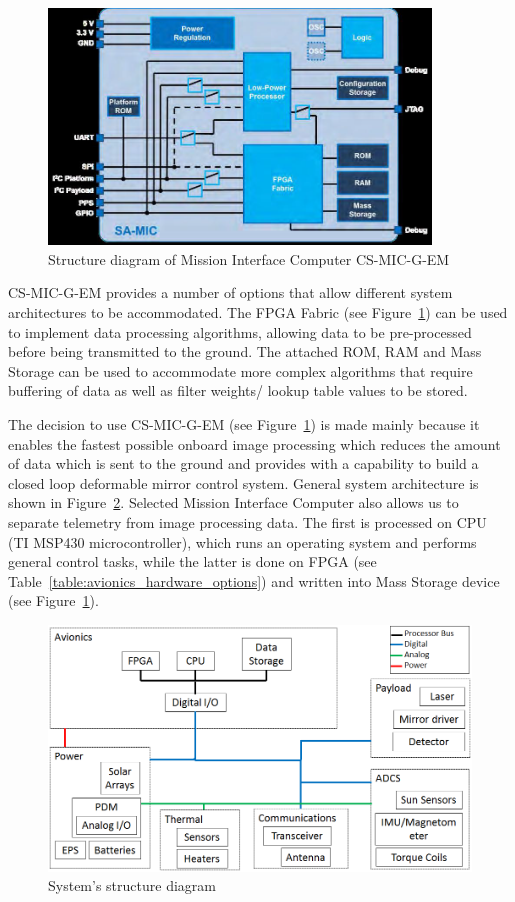 \documentclass[12pt]{article}
\begin{document}
\begin{figure}[ht]
\centering
  \includegraphics[width=4in]{images/Avionics_fig1.png}
\caption{Structure diagram of Mission Interface Computer CS-MIC-G-EM  \cite{avionics_clyde_space}}
\label{fig:avionics_MIC}
\end{figure}

CS-MIC-G-EM provides a number of options that allow different system architectures to be accommodated. The FPGA Fabric (see Figure~\ref{fig:avionics_MIC}) can be used to implement data processing algorithms, allowing data to be pre-processed before being transmitted to the ground. The attached ROM, RAM and Mass Storage can be used to accommodate more complex algorithms that require buffering of data as well as filter weights/ lookup table values to be stored.

The decision to use CS-MIC-G-EM (see Figure~\ref{fig:avionics_MIC}) is made mainly because it enables the fastest possible onboard image processing \cite{avionics_FPGA} which reduces the amount of data which is sent to the ground and provides with a capability to build a closed loop deformable mirror control system.
General system architecture is shown in Figure~\ref{fig:avionics_architecture}. Selected Mission Interface Computer also allows us to separate telemetry from image processing data. The first is processed on CPU (TI MSP430 microcontroller), which runs an operating system and performs general control tasks, while the latter is done on FPGA (see Table~\ref{table:avionics_hardware_options}) and written into Mass Storage device (see Figure~\ref{fig:avionics_MIC}).

\begin{figure}[ht]
\centering
  \includegraphics[width=7in]{images/Avionics_fig2.PNG}
\caption{System's structure diagram}
\label{fig:avionics_architecture}
\end{figure}
\end{document}
